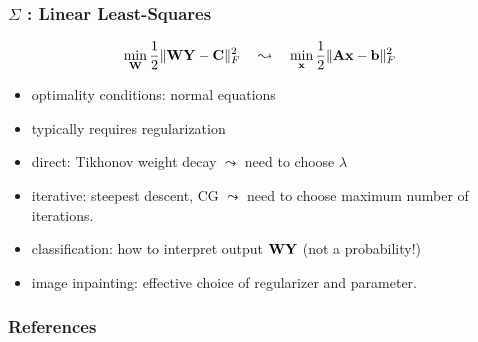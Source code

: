 \documentclass[12pt,fleqn,handout]{beamer}
\begin{document}
%

\begin{frame}
	\frametitle{$\Sigma$ : Linear Least-Squares}
		\begin{equation*}
			 \min_{{\bf W}} {\frac 12} \|{\bf W} {\bf Y} - {\bf C}\|^2_F \quad \leadsto \quad\min_{{\bf x}} {\frac 12} \|{\bf A} {\bf x} - {\bf b}\|^2_F
		\end{equation*}
	\begin{itemize}
		\item optimality conditions: normal equations
		\item typically requires regularization
		\item direct: Tikhonov weight decay $\leadsto$ need to choose $\lambda$
		\item iterative: steepest descent, CG $\leadsto$ need to choose maximum number of iterations.
		\item classification: how to interpret output ${\bf W} {\bf Y}$ (not a probability!)
		\item image inpainting: effective choice of regularizer and parameter.
	\end{itemize}
\end{frame}

\begin{frame}[allowframebreaks]
	\frametitle{References}



\end{frame}
\end{document}
